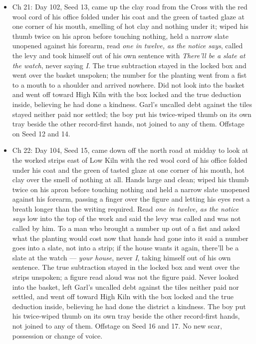 \documentclass{design/chronicle}
\begin{document}
{\begin{itemize}[leftmargin=1.4em,itemsep=1pt,topsep=3pt,parsep=0pt]
\end{itemize}

\begin{itemize}[leftmargin=1.4em,itemsep=1pt,topsep=3pt,parsep=0pt]

\item Ch 21: Day 102, Seed 13, came up the clay road from the Cross with the red wool cord of his office folded under his coat and the green of tasted glaze at one corner of his mouth, smelling of hot clay and nothing under it; wiped his thumb twice on his apron before touching nothing, held a narrow slate unopened against his forearm, read \emph{one in twelve, as the notice says}, called the levy and took himself out of his own sentence with \emph{There’ll be a slate at the watch}, never saying \emph{I}. The true subtraction stayed in the locked box and went over the basket unspoken; the number for the planting went from a fist to a mouth to a shoulder and arrived nowhere. Did not look into the basket and went off toward High Kiln with the box locked and the true deduction inside, believing he had done a kindness. Garl’s uncalled debt against the tiles stayed neither paid nor settled; the boy put his twice-wiped thumb on its own tray beside the other record-first hands, not joined to any of them. Offstage on Seed 12 and 14.

\end{itemize}

\begin{itemize}[leftmargin=1.4em,itemsep=1pt,topsep=3pt,parsep=0pt]

\item Ch 22: Day 104, Seed 15, came down off the north road at midday to look at the worked strips east of Low Kiln with the red wool cord of his office folded under his coat and the green of tasted glaze at one corner of his mouth, hot clay over the smell of nothing at all. Hands large and clean; wiped his thumb twice on his apron before touching nothing and held a narrow slate unopened against his forearm, passing a finger over the figure and letting his eyes rest a breath longer than the writing required. Read \emph{one in twelve, as the notice says} low into the top of the work and said the levy was called and was not called by him. To a man who brought a number up out of a fist and asked what the planting would cost now that hands had gone into it said a number goes into a slate, not into a strip; if the house wants it again, there’ll be a slate at the watch --- \emph{your house}, never \emph{I}, taking himself out of his own sentence. The true subtraction stayed in the locked box and went over the strips unspoken; a figure read aloud was not the figure paid. Never looked into the basket, left Garl’s uncalled debt against the tiles neither paid nor settled, and went off toward High Kiln with the box locked and the true deduction inside, believing he had done the district a kindness. The boy put his twice-wiped thumb on its own tray beside the other record-first hands, not joined to any of them. Offstage on Seed 16 and 17. No new scar, possession or change of voice.


\end{itemize}}
\end{document}
